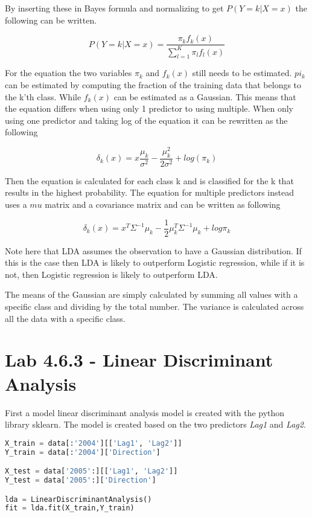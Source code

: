 By inserting these in Bayes formula and normalizing to get $P(Y=k|X=x)$ the following can be written.

\begin{equation}
	P(Y=k|X = x) = \dfrac{\pi_k f_k(x)}{\sum_{l=1}^{K} \pi_l f_l(x)}
\end{equation}

For the equation the two variables $\pi_k$ and $f_k(x)$ still needs to be estimated. $pi_k$ can be estimated by computing the fraction of the training data that belongs to the k'th class. While $f_k(x)$ can be estimated as a Gaussian. This means that the equation differs when using only 1 predictor to using multiple. When only using one predictor and taking log of the equation it can be rewritten as the following

\begin{equation}
	\delta_k(x) = x  \dfrac{\mu_k}{\sigma^2} - \dfrac{\mu_k^2}{2\sigma^2} + log(\pi_k)
\end{equation}

Then the equation is calculated for each class k and is classified for the k that results in the highest probability. The equation for multiple predictors instead uses a $mu$ matrix and a covariance matrix and can be written as following

\begin{equation}
	\delta_k(x) = x^T \Sigma^{-1} \mu_k -  \frac{1}{2} \mu_k^{T} \Sigma^{-1} \mu_k + log \pi_k
\end{equation}

Note here that LDA assumes the observation to have a Gaussian distribution. If this is the case then LDA is likely to outperform Logistic regression, while if it is not, then Logistic regression is likely to outperform LDA. 

The means of the Gaussian are simply calculated by summing all values with a specific class and dividing by the total number.
The variance is calculated across all the data with a specific class.

\section{Lab 4.6.3 - Linear Discriminant Analysis}
First a model linear discriminant analysis model is created with the python library sklearn. The model is created based on the two predictors \emph{Lag1} and \emph{Lag2}. 


\begin{lstlisting}[language=Python, label=lst:ldaModel, caption=creating linear discriminant analysis model sklearn]
X_train = data[:'2004'][['Lag1', 'Lag2']]
Y_train = data[:'2004']['Direction']

X_test = data['2005':][['Lag1', 'Lag2']]
Y_test = data['2005':]['Direction']

lda = LinearDiscriminantAnalysis()
fit = lda.fit(X_train,Y_train)
\end{lstlisting}

